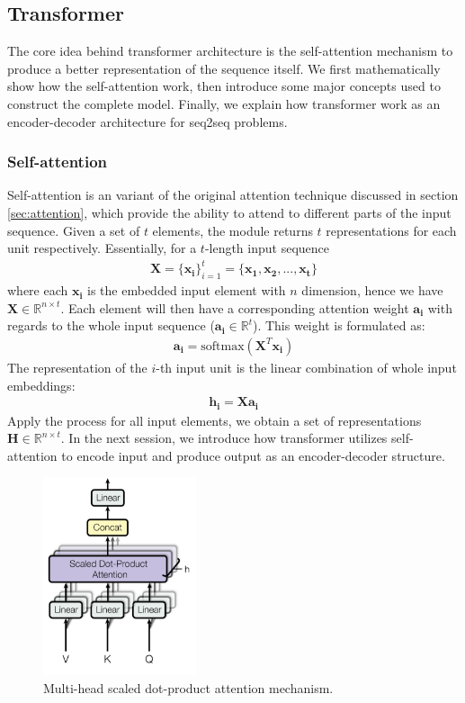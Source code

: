 \subsection{Transformer}
\label{sec:transformer}
The core idea behind transformer architecture is the self-attention mechanism to produce a better representation of the sequence itself. 
We first mathematically show how the self-attention work, then introduce some major concepts used to construct the complete model. 
Finally, we explain how transformer work as an encoder-decoder architecture for seq2seq problems. 
\subsubsection{Self-attention}
\label{sec:self_attn}
Self-attention is an variant of the original attention technique discussed in section \ref{sec:attention}, which provide the ability to attend to different parts of the input sequence. Given a set of $t$ elements, the module returns $t$ representations for each unit respectively.
Essentially, for a $t$-length input sequence
\begin{align*}
    \mathbf{X} = \{{\mathbf{x_i}}\}_{i=1}^t = \{\mathbf{x_1}, \mathbf{x_2}, ..., \mathbf{x_t}\}
\end{align*}
where each $\mathbf{x_i}$ is the embedded input element with $n$ dimension, hence we have $\mathbf{X} \in \mathbb{R}^{n \times t}$.
Each element will then have a corresponding attention weight $\mathbf{a_i}$ with regards to the whole input sequence ($\mathbf{a_i} \in \mathbb{R}^t$). This weight is formulated as:
\begin{align}
    \label{eqn:self_attn_alpha}
    \mathbf{a_i} = \mathrm{softmax}(\mathbf{X}^T\mathbf{x_i})
\end{align}
The representation of the $i$-th input unit is the linear combination of whole input embeddings:
\begin{align}
    \mathbf{h_i} =  \mathbf{X}\mathbf{a_i}
\end{align}
Apply the process for all input elements, we obtain a set of representations $\mathbf{H} \in \mathbb{R}^{n \times t}$. In the next session, we introduce how transformer utilizes self-attention to encode input and produce output as an encoder-decoder structure.
\begin{figure}[t!]
    \centering
    \includegraphics[width=0.4\textwidth]{images/Transformer_multi-head.png}
    \caption{Multi-head scaled dot-product attention mechanism.\cite{vaswani2017attention}}
    \label{fig:trans_multi-head}
\end{figure}
